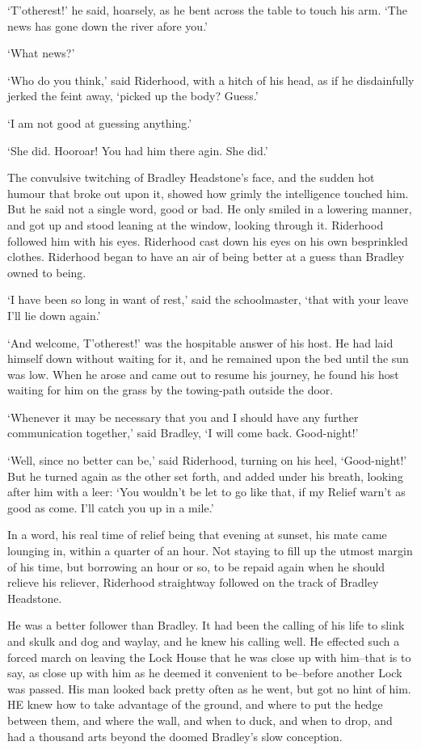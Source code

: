 ‘T’otherest!’ he said, hoarsely, as he bent across the table to touch
his arm. ‘The news has gone down the river afore you.’

‘What news?’

‘Who do you think,’ said Riderhood, with a hitch of his head, as if he
disdainfully jerked the feint away, ‘picked up the body? Guess.’

‘I am not good at guessing anything.’

‘She did. Hooroar! You had him there agin. She did.’

The convulsive twitching of Bradley Headstone’s face, and the sudden
hot humour that broke out upon it, showed how grimly the intelligence
touched him. But he said not a single word, good or bad. He only smiled
in a lowering manner, and got up and stood leaning at the window,
looking through it. Riderhood followed him with his eyes. Riderhood cast
down his eyes on his own besprinkled clothes. Riderhood began to have an
air of being better at a guess than Bradley owned to being.

‘I have been so long in want of rest,’ said the schoolmaster, ‘that with
your leave I’ll lie down again.’

‘And welcome, T’otherest!’ was the hospitable answer of his host. He had
laid himself down without waiting for it, and he remained upon the bed
until the sun was low. When he arose and came out to resume his journey,
he found his host waiting for him on the grass by the towing-path
outside the door.

‘Whenever it may be necessary that you and I should have any further
communication together,’ said Bradley, ‘I will come back. Good-night!’

‘Well, since no better can be,’ said Riderhood, turning on his heel,
‘Good-night!’ But he turned again as the other set forth, and added
under his breath, looking after him with a leer: ‘You wouldn’t be let to
go like that, if my Relief warn’t as good as come. I’ll catch you up in
a mile.’

In a word, his real time of relief being that evening at sunset, his
mate came lounging in, within a quarter of an hour. Not staying to fill
up the utmost margin of his time, but borrowing an hour or so, to be
repaid again when he should relieve his reliever, Riderhood straightway
followed on the track of Bradley Headstone.

He was a better follower than Bradley. It had been the calling of his
life to slink and skulk and dog and waylay, and he knew his calling
well. He effected such a forced march on leaving the Lock House that he
was close up with him--that is to say, as close up with him as he deemed
it convenient to be--before another Lock was passed. His man looked back
pretty often as he went, but got no hint of him. HE knew how to take
advantage of the ground, and where to put the hedge between them, and
where the wall, and when to duck, and when to drop, and had a thousand
arts beyond the doomed Bradley’s slow conception.

